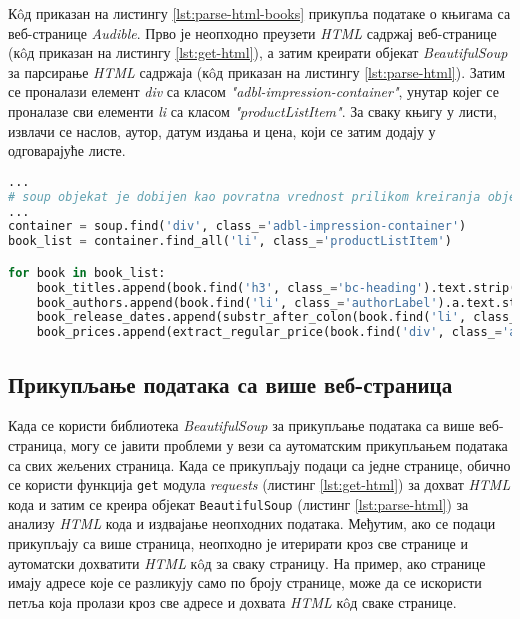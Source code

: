\documentclass[12pt,oneside]{memoir}
\begin{document}
Кôд приказан на листингу \ref{lst:parse-html-books} прикупља податаке о књигама са веб-странице \textit{Audible}. Прво је неопходно преузети \textit{HTML} садржај веб-странице (кôд приказан на листингу \ref{lst:get-html}), а затим креирати објекат \textit{BeautifulSoup} за парсирање  \textit{HTML} садржаја (кôд приказан на листингу \ref{lst:parse-html}). Затим се проналази елемент \textit{div} са класом \textit{"adbl-impression-container"}, унутар којег се проналазе сви елементи \textit{li} са класом \textit{"productListItem"}. За сваку књигу у листи, извлачи се наслов, аутор, датум издања и цена, који се затим додају у одговарајуће листе.

\begin{lstlisting}[language=Python, caption={
Издвајање наслова, аутора, датума издања и цене књиге из \textit{HTML} кода веб-странице}, label={lst:parse-html-books}]
...
# soup objekat je dobijen kao povratna vrednost prilikom kreiranja objekta tipa BeautifulSoup
...
container = soup.find('div', class_='adbl-impression-container')
book_list = container.find_all('li', class_='productListItem')

for book in book_list:
    book_titles.append(book.find('h3', class_='bc-heading').text.strip())
    book_authors.append(book.find('li', class_='authorLabel').a.text.strip())
    book_release_dates.append(substr_after_colon(book.find('li', class_='releaseDateLabel').text.strip()))
    book_prices.append(extract_regular_price(book.find('div', class_='adblBuyBoxPrice').text.strip()))
\end{lstlisting}

\subsection{Прикупљање података са више веб-страница} 
Када се користи библиотека \textit{BeautifulSoup} за прикупљање података са више веб-страница, могу се јавити проблеми у вези са аутоматским прикупљањем података са свих жељених страница. Када се прикупљају подаци са једне странице, обично се користи функција \texttt{get} модула \textit{requests} (листинг \ref{lst:get-html}) за дохват \textit{HTML} кода и затим се креира објекат \texttt{BeautifulSoup} (листинг \ref{lst:parse-html}) за анализу \textit{HTML} кода и издвајање неопходних података. Међутим, ако се подаци прикупљају са више страница, неопходно је итерирати кроз све странице и аутоматски дохватити \textit{HTML} кôд за сваку страницу. На пример, ако странице имају адресе које се разликују само по броју странице, може да се искористи петља која пролази кроз све адресе и дохвата \textit{HTML} кôд сваке странице.
\end{document}

